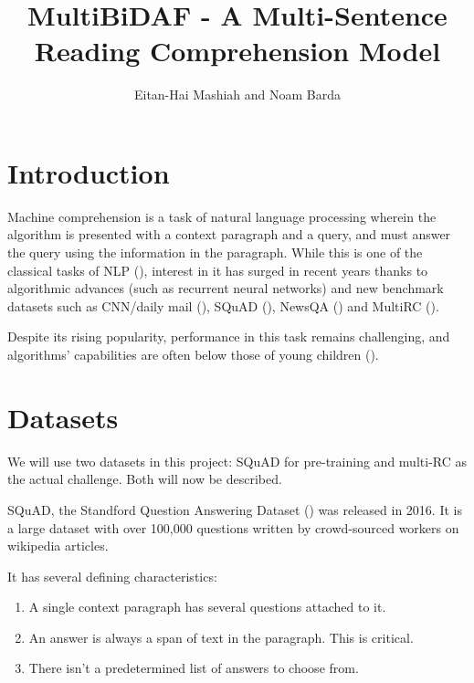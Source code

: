 \documentclass[12pt, a4paper]{article}
\begin{document}
	
	\title{MultiBiDAF - A Multi-Sentence Reading Comprehension Model}
	\author{Eitan-Hai Mashiah and Noam Barda}
	\maketitle
	
	\begin{multicols}{2}
		
		\section{Introduction}
		
			Machine comprehension is a task of natural language processing wherein the algorithm is presented with a context paragraph and a query, and must answer the query using the information in the paragraph. While this is one of the classical tasks of NLP (\cite{Mccarthy1976}), interest in it has surged in recent years thanks to algorithmic advances (such as recurrent neural networks) and new benchmark datasets such as CNN/daily mail (\cite{Hermann2015}), SQuAD (\cite{Rajpurkar2016}), NewsQA (\cite{Trischler2016}) and MultiRC (\cite{N18-1023}).
			
			Despite its rising popularity, performance in this task remains challenging, and algorithms' capabilities are often below those of young children (\cite{Clark2016}).
			
		\section{Datasets}
		
			We will use two datasets in this project: SQuAD for pre-training and multi-RC as the actual challenge. Both will now be described.
			
			SQuAD, the Standford Question Answering Dataset (\cite{Rajpurkar2016}) was released in 2016. It is a large dataset with over 100,000 questions written by crowd-sourced workers on wikipedia articles.
			
			It has several defining characteristics:
			\begin{enumerate}
				\item A single context paragraph has several questions attached to it.
				\item An answer is always a span of text in the paragraph. This is critical.
				\item There isn't a predetermined list of answers to choose from.
			\end{enumerate}
		

\end{multicols}
\end{document}
